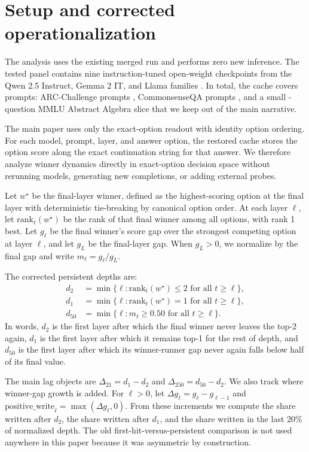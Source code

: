 \section{Setup and corrected operationalization}

The analysis uses the existing merged run \texttt{\MergedRunId} and performs zero new inference. The tested panel contains nine instruction-tuned open-weight checkpoints from the Qwen 2.5 Instruct, Gemma 2 IT, and Llama families \citep{qwen25card,gemma2card,llama3herd}. In total, the cache covers \PaperPromptCount{} prompts: \ArcPromptCount{} ARC-Challenge prompts \citep{clark2018arc}, \CsqaPromptCount{} CommonsenseQA prompts \citep{talmor2019commonsenseqa}, and a small \MmluPromptCount{}-question MMLU Abstract Algebra slice \citep{hendrycks2021mmlu} that we keep out of the main narrative.

The main paper uses only the exact-option readout with identity option ordering. For each model, prompt, layer, and answer option, the restored cache stores the option score along the exact continuation string for that answer. We therefore analyze winner dynamics directly in exact-option decision space without rerunning models, generating new completions, or adding external probes.

Let $w^\star$ be the final-layer winner, defined as the highest-scoring option at the final layer with deterministic tie-breaking by canonical option order. At each layer $\ell$, let $\mathrm{rank}_\ell(w^\star)$ be the rank of that final winner among all options, with rank 1 best. Let $g_\ell$ be the final winner's score gap over the strongest competing option at layer $\ell$, and let $g_L$ be the final-layer gap. When $g_L > 0$, we normalize by the final gap and write $m_\ell = g_\ell / g_L$.

The corrected persistent depths are:
\begin{align}
d_2 &= \min \{\ell : \mathrm{rank}_t(w^\star) \le 2 \text{ for all } t \ge \ell\}, \\
d_1 &= \min \{\ell : \mathrm{rank}_t(w^\star) = 1 \text{ for all } t \ge \ell\}, \\
d_{50} &= \min \{\ell : m_t \ge 0.50 \text{ for all } t \ge \ell\}.
\end{align}
In words, $d_2$ is the first layer after which the final winner never leaves the top-2 again, $d_1$ is the first layer after which it remains top-1 for the rest of depth, and $d_{50}$ is the first layer after which its winner-runner gap never again falls below half of its final value.

The main lag objects are $\Delta_{21} = d_1 - d_2$ and $\Delta_{250} = d_{50} - d_2$. We also track where winner-gap growth is added. For $\ell > 0$, let $\Delta g_\ell = g_\ell - g_{\ell-1}$ and $\mathrm{positive\_write}_\ell = \max(\Delta g_\ell, 0)$. From these increments we compute the share written after $d_2$, the share written after $d_1$, and the share written in the last 20\% of normalized depth. The old first-hit-versus-persistent comparison is not used anywhere in this paper because it was asymmetric by construction.
